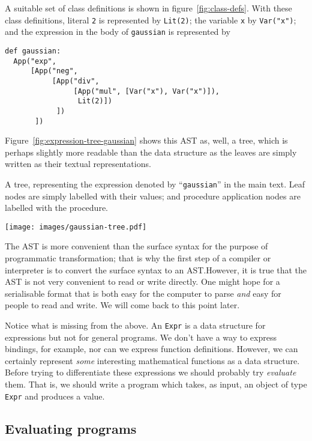 \documentclass[11pt, a4paper]{article}
\newcommand{\cd}[1]{\texttt{#1}}
\begin{document}
A suitable set of class definitions is shown in
figure~\ref{fig:class-defs}. With these class definitions, literal
\cd{2} is represented by \cd{Lit(2)}; the variable \cd{x} by
\cd{Var("x")}; and the expression in the body of \cd{gaussian} is
represented by
\begin{verbatim}
def gaussian:
  App("exp",
      [App("neg",
           [App("div",
                [App("mul", [Var("x"), Var("x")]),
                 Lit(2)])
            ])
       ])
\end{verbatim}
Figure~\ref{fig:expression-tree-gaussian} shows this AST as, well, a
tree, which is perhaps slightly more readable than the data structure
as the leaves are simply written as their textual representations.
 \begin{marginfigure}
  \caption{A tree, representing the expression denoted by
    ``\cd{gaussian}'' in the main text. Leaf nodes are simply
    labelled with their values; and procedure application nodes are
    labelled with the procedure.\label{fig:expression-tree-gaussian}}
  \centering
  \texttt{[image: images/gaussian-tree.pdf]}
\end{marginfigure}

The AST is more convenient than the surface syntax for the purpose of
programmatic transformation; that is why the first step of a compiler
or interpreter is to convert the surface syntax to an AST.\@ However,
it is true that the AST is not very convenient to read or write
directly. One might hope for a serialisable format that is both easy
for the computer to parse \emph{and} easy for people to read and
write. We will come back to this point later.

Notice what is missing from the above. An \cd{Expr} is a data
structure for expressions but not for general programs. We don't have
a way to express bindings, for example, nor can we express function
definitions. However, we can certainly represent \emph{some}
interesting mathematical functions as a data structure. Before trying
to differentiate these expressions we should probably try
\emph{evaluate} them. That is, we should write a program which takes,
as input, an object of type \cd{Expr} and produces a value.

\subsection{Evaluating programs}
\end{document}
